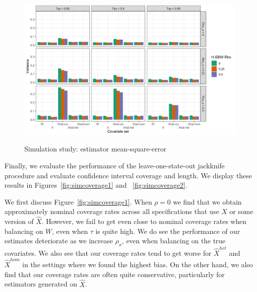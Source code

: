 \begin{figure}[H]
\begin{center}
    \caption{Simulation study: estimator mean-square-error}\label{fig:simmse}
    \label{fig:loveplotc1}
    \includegraphics[scale=0.5]{01_Plots/var-plot.png}
\end{center}
\end{figure}

Finally, we evaluate the performance of the leave-one-state-out jackknife procedure and evaluate confidence interval coverage and length. We display these results in Figures~\ref{fig:simcoverage1} and ~\ref{fig:simcoverage2}. 

We first discuss Figure~\ref{fig:simcoverage1}. When $\rho = 0$ we find that we obtain approximately nominal coverage rates across all specifications that use $X$ or some version of $\hat{X}$. However, we fail to get even close to nominal coverage rates when balancing on $W$, even when $\tau$ is quite high. We do see the performance of our estimates deteriorate as we increase $\rho_x$, even when balancing on the true covariates. We also see that our coverage rates tend to get worse for $\hat{X}^{het}$ and $\hat{X}^{hom}$ in the settings where we found the highest bias. On the other hand, we also find that our coverage rates are often quite conservative, particularly for estimators generated on $\hat{X}$. 

